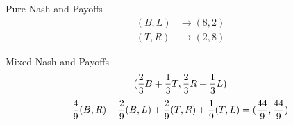 \documentclass[
  course = {{IE579 Game Theory and Multi-Agent Reinforcement Learning}},
  quartile = {{4}},
  assignment = 2,
  name = {{Mohammad Mahdi Rahimi}},
  studentnumber = {{20208244}},
  email = {{mahi@kaist.ac.kr}},
  firstexercise = 1
]{aga-homework}
\begin{document}
\exercise
\subexercise Pure Nash and Payoffs
\\
\begin{equation} \label{eq1}
\begin{split}
(B, L) & \rightarrow (8, 2)\\
(T, R) & \rightarrow (2, 8)
\end{split}
\end{equation}

\subexercise Mixed Nash and Payoffs
\begin{equation} \label{eq1}
\begin{split}
({2 \over 3}B + {1 \over 3} T, {2 \over 3}R + {1 \over 3}L)
\end{split}
\end{equation}
\begin{equation} \label{eq1}
\begin{split}
{4 \over 9}(B,R) + {2 \over 9}(B, L) + {2 \over 9}(T, R) + {1 \over 9}(T, L) = ({44 \over 9}, {44 \over 9})
\end{split}
\end{equation}
\end{document}
